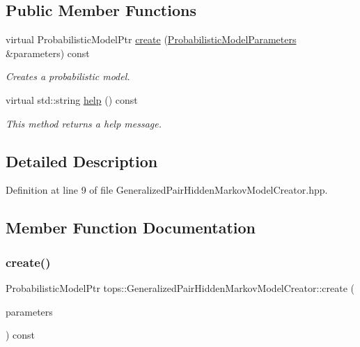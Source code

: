 \subsection*{Public Member Functions}
\begin{DoxyCompactItemize}
\item 
virtual Probabilistic\+Model\+Ptr \hyperlink{classtops_1_1GeneralizedPairHiddenMarkovModelCreator_a0f83a29fb5bf772d82ce311ba3e16216}{create} (\hyperlink{classtops_1_1ProbabilisticModelParameters}{Probabilistic\+Model\+Parameters} \&parameters) const
\begin{DoxyCompactList}\small\item\em Creates a probabilistic model. \end{DoxyCompactList}\item 
\mbox{\label{classtops_1_1GeneralizedPairHiddenMarkovModelCreator_a51574d0c38fdf8b8fd2d703b4481b861}} 
virtual std\+::string \hyperlink{classtops_1_1GeneralizedPairHiddenMarkovModelCreator_a51574d0c38fdf8b8fd2d703b4481b861}{help} () const
\begin{DoxyCompactList}\small\item\em This method returns a help message. \end{DoxyCompactList}\end{DoxyCompactItemize}


\subsection{Detailed Description}


Definition at line 9 of file Generalized\+Pair\+Hidden\+Markov\+Model\+Creator.\+hpp.



\subsection{Member Function Documentation}
\mbox{\label{classtops_1_1GeneralizedPairHiddenMarkovModelCreator_a0f83a29fb5bf772d82ce311ba3e16216}} 
\subsubsection{\texorpdfstring{create()}{create()}}
{\footnotesize\ttfamily Probabilistic\+Model\+Ptr tops\+::\+Generalized\+Pair\+Hidden\+Markov\+Model\+Creator\+::create (\begin{DoxyParamCaption}\item[{\hyperlink{classtops_1_1ProbabilisticModelParameters}{Probabilistic\+Model\+Parameters} \&}]{parameters }\end{DoxyParamCaption}) const\hspace{0.3cm}{\ttfamily [virtual]}}



